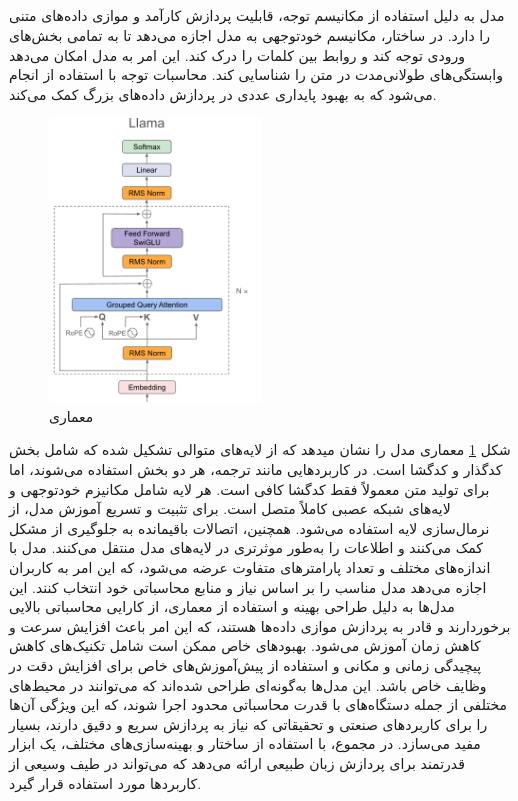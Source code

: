 \subsection{}
مدل  به دلیل استفاده از مکانیسم توجه، قابلیت پردازش کارآمد و موازی داده‌های متنی را دارد. در ساختار، مکانیسم خودتوجهی به مدل اجازه می‌دهد تا به تمامی بخش‌های ورودی توجه کند و روابط بین کلمات را درک کند. این امر به مدل امکان می‌دهد وابستگی‌های طولانی‌مدت در متن را شناسایی کند. محاسبات توجه با استفاده از انجام می‌شود که به بهبود پایداری عددی در پردازش داده‌های بزرگ کمک می‌کند.
\begin{figure}[H]
	\centering
	\includegraphics[width=0.5\textwidth]{figures/LLaMA.png}
	\caption{معماری }
	\label{fig:LLaMA}
\end{figure}
شکل \ref{fig:LLaMA} معماری مدل  را نشان میدهد که از لایه‌های متوالی تشکیل شده که شامل بخش کدگذار و کدگشا است. در کاربردهایی مانند ترجمه، هر دو بخش استفاده می‌شوند، اما برای تولید متن معمولاً فقط کدگشا کافی است. هر لایه شامل مکانیزم خودتوجهی و لایه‌های شبکه عصبی کاملاً متصل است. برای تثبیت و تسریع آموزش مدل، از نرمال‌سازی لایه استفاده می‌شود. همچنین، اتصالات باقیمانده به جلوگیری از مشکل کمک می‌کنند و اطلاعات را به‌طور موثرتری در لایه‌های مدل منتقل می‌کنند.
مدل  با اندازه‌های مختلف و تعداد پارامترهای متفاوت عرضه می‌شود، که این امر به کاربران اجازه می‌دهد مدل مناسب را بر اساس نیاز و منابع محاسباتی خود انتخاب کنند. این مدل‌ها به دلیل طراحی بهینه و استفاده از معماری، از کارایی محاسباتی بالایی برخوردارند و قادر به پردازش موازی داده‌ها هستند، که این امر باعث افزایش سرعت و کاهش زمان آموزش می‌شود.
بهبودهای خاص  ممکن است شامل تکنیک‌های کاهش پیچیدگی زمانی و مکانی و استفاده از پیش‌آموزش‌های خاص برای افزایش دقت در وظایف خاص باشد. این مدل‌ها به‌گونه‌ای طراحی شده‌اند که می‌توانند در محیط‌های مختلفی از جمله دستگاه‌های با قدرت محاسباتی محدود اجرا شوند، که این ویژگی آن‌ها را برای کاربردهای صنعتی و تحقیقاتی که نیاز به پردازش سریع و دقیق دارند، بسیار مفید می‌سازد.
در مجموع،  با استفاده از ساختار و بهینه‌سازی‌های مختلف، یک ابزار قدرتمند برای پردازش زبان طبیعی ارائه می‌دهد که می‌تواند در طیف وسیعی از کاربردها مورد استفاده قرار گیرد.\cite{touvron2023llama}

